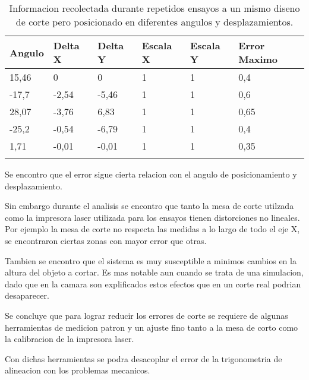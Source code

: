      \begin{longtable}[!h]{m{}m{}m{}m{}m{}m{}}
            \caption[Ensayos de corte simulado]{Informacion recolectada durante repetidos ensayos a un mismo diseno de corte pero posicionado en diferentes angulos y desplazamientos.}\\
            \toprule
               \textbf{Angulo} & \textbf{Delta X} & \textbf{Delta Y} & \textbf{Escala X} & \textbf{Escala Y} & \textbf{Error Maximo} \\ 
            \midrule
            \endfirsthead
            {15,46}& {0}&     {0}     & {1} & {1} & {0,4}\\
            {-17,7}& {-2,54}& {-5,46} & {1} & {1} & {0,6}\\
            {28,07}& {-3,76}& {6,83}  & {1} & {1} & {0,65}\\
            {-25,2}& {-0,54}& {-6,79} & {1} & {1} & {0,4}\\
            {1,71}&  {-0,01}& {-0,01} & {1} & {1} & {0,35}\\
               \bottomrule
            \label{tbl:ensayo_A}
         \end{longtable}

         Se encontro que el error sigue cierta relacion con el angulo de posicionamiento y desplazamiento.\par
      Sin embargo durante el analisis se encontro que tanto la mesa de corte utilzada como la impresora laser utilizada para los ensayos tienen distorciones no lineales. Por ejemplo la mesa de corte no respecta las medidas a lo largo de todo el eje X, se encontraron ciertas zonas con mayor error que otras. \par
      Tambien se encontro que el sistema es muy susceptible a minimos cambios en la altura del objeto a cortar. Es mas notable aun cuando se trata de una simulacion, dado que en la camara son explificados estos efectos que en un corte real podrian desaparecer.\par
      Se concluye que para lograr reducir los errores de corte se requiere de algunas herramientas de medicion patron y un ajuste fino tanto a la mesa de corto como la calibracion de la impresora laser.\par
      Con dichas herramientas se podra desacoplar el error de la trigonometria de alineacion con los problemas mecanicos.


